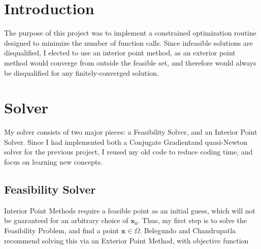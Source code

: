 \documentclass{article}
\newcommand{\bs}[1]{\boldsymbol{#1}}
\begin{document}



\section{Introduction}
The purpose of this project was to implement a constrained optimization routine designed to minimize the number of function calls. Since infeasible solutions are disqualified, I elected to use an interior point method, as an exterior point method would converge from outside the feasible set, and therefore would always be disqualified for any finitely-converged solution.

\section{Solver}
My solver consists of two major pieces: a Feasibility Solver, and an Interior Point Solver. Since I had implemented both a Conjugate Gradient\footnotemark and quasi-Newton solver for the previous project, I reused my old code to reduce coding time, and focus on learning new concepts. 

\subsection{Feasibility Solver}
Interior Point Methods require a feasible point as an initial guess, which will not be guaranteed for an arbitrary choice of $\bs{x}_0$. Thus, my first step is to solve the Feasibility Problem, and find a point $\bs{x}\in\Omega$. Belegundo and Chandrupatla recommend solving this via an Exterior Point Method, with objective function \cite{mdo}
\end{document}
